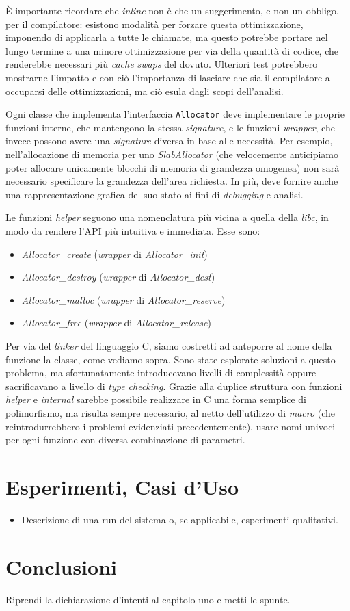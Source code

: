 \documentclass[noexaminfo]{sapthesis}  %
\begin{document}
È importante ricordare che \textit{inline} non è che un suggerimento, e non un obbligo, per il compilatore: esistono modalità per forzare questa ottimizzazione, imponendo di applicarla a tutte le chiamate, ma questo potrebbe portare nel lungo termine a una minore ottimizzazione per via della quantità di codice, che renderebbe necessari più \textit{cache swaps} del dovuto. Ulteriori test potrebbero mostrarne l’impatto e con ciò l’importanza di lasciare che sia il compilatore a occuparsi delle ottimizzazioni, ma ciò esula dagli scopi dell’analisi.

Ogni classe che implementa l’interfaccia \texttt{Allocator} deve implementare le proprie funzioni interne, che mantengono la stessa \textit{signature}, e le funzioni \textit{wrapper}, che invece possono avere una \textit{signature} diversa in base alle necessità. Per esempio, nell’allocazione di memoria per uno \textit{SlabAllocator} (che velocemente anticipiamo poter allocare unicamente blocchi di memoria di grandezza omogenea) non sarà necessario specificare la grandezza dell’area richiesta. In più, deve fornire anche una rappresentazione grafica del suo stato ai fini di \textit{debugging} e analisi.

Le funzioni \textit{helper} seguono una nomenclatura più vicina a quella della \textit{libc}, in modo da rendere l’API più intuitiva e immediata. Esse sono:
\begin{itemize}
  \item \textit{Allocator\_create} (\textit{wrapper} di \textit{Allocator\_init})
  \item \textit{Allocator\_destroy} (\textit{wrapper} di \textit{Allocator\_dest})
  \item \textit{Allocator\_malloc} (\textit{wrapper} di \textit{Allocator\_reserve})
  \item \textit{Allocator\_free} (\textit{wrapper} di \textit{Allocator\_release})
\end{itemize}

Per via del \textit{linker} del linguaggio C, siamo costretti ad anteporre al nome della funzione la classe, come vediamo sopra. Sono state esplorate soluzioni a questo problema, ma sfortunatamente introducevano livelli di complessità oppure sacrificavano a livello di \textit{type checking}. Grazie alla duplice struttura con funzioni \textit{helper} e \textit{internal} sarebbe possibile realizzare in C una forma semplice di polimorfismo, ma risulta sempre necessario, al netto dell’utilizzo di \textit{macro} (che reintrodurrebbero i problemi evidenziati precedentemente), usare nomi univoci per ogni funzione con diversa combinazione di parametri.

\chapter{Esperimenti, Casi d’Uso}

\begin{itemize}
  \item Descrizione di una run del sistema o, se applicabile, esperimenti qualitativi.
\end{itemize}

\chapter{Conclusioni}

Riprendi la dichiarazione d’intenti al capitolo uno e metti le spunte.

\backmatter
\cleardoublepage
\end{document}
